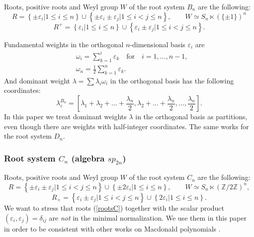 \documentclass{article}
\def\ve{\varepsilon}
\def\ep{\varepsilon}
\begin{document}
Roots, positive roots and Weyl group $W$ of the root system $B_n$ are the following:
\begin{equation}
    R = \left\{\pm \ve_i | 1\leq i\leq n \right\} \cup \left\{\pm \ve_i\pm \ve_j| 1\leq i < j \leq n\right\}, \quad\quad W \simeq S_{n} \ltimes (\{\pm 1\})^n\end{equation}
\begin{equation}
    R^+ = \left\{\ve_i | 1\leq i\leq n \right\} \cup \left\{ \ve_i\pm \ve_j| 1\leq i < j \leq n\right\}. \label{rootsBplus}
    \end{equation}

Fundamental weights in the orthogonal $n$-dimensional basis $\ep_i$ are
\begin{align}
  &  \omega_i = \sum_{k=1}^{i} \ep_k \quad \text{for} \quad i=1,\dots,n-1, \\
  & \omega_n = \frac{1}{2} \sum_{k=1}^{n} \ep_k \label{OmegaNB}.
\end{align}
And dominant weight $\lambda = \sum \lambda_i \omega_i$ in the orthogonal basis has the following coordinates:
\begin{equation}
  \lambda^{B_n}_{\ve} =   \left [\lambda_1+\lambda_2+\dots+\frac{\lambda_n}{2},\lambda_2+\dots+\frac{\lambda_n}{2},\dots,\frac{\lambda_n}{2} \right].
   \label{weightB}
\end{equation}
In this paper we treat dominant weights $\lambda$ in the orthogonal basis as partitions, even though there are weights with half-integer coordinates. The same works for the root system $D_n$.


\subsubsection{Root system $C_n$ (algebra $sp_{2n}$)}

Roots, positive roots and Weyl group $W$ of the root system $C_n$ are the following:
\begin{equation}
    R =  \left\{\pm  \ve_i\pm \ve_j| 1\leq i < j \leq n\right\}\cup\left\{\pm 2\ve_i | 1\leq i\leq n \right\} , \quad\quad W \simeq S_{n} \ltimes (\mathbb{Z}/2\mathbb{Z})^n, \label{rootsC}
    \end{equation}
    \begin{equation}
    R_{+} =  \left\{\ve_i\pm \ve_j| 1\leq i < j \leq n\right\}\cup\left\{2\ve_i | 1\leq i\leq n \right\}.\label{rootsCplus}
    \end{equation}
We want to stress that roots (\ref{rootsC}) together with the scalar product $(\ve_i,\ve_j)=\delta_{ij}$ are \textit{not} in the minimal normalization. We use them in this paper in order to be consistent with other works on Macdonald polynomials \cite{Koorn}.
\end{document}
